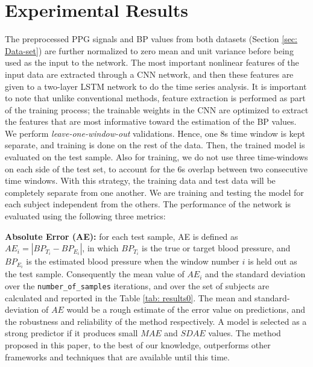 \documentclass[letterpaper, 10 pt, conference]{ieeeconf}
\begin{document}
\section{Experimental Results} 
\label{sec: results}
The preprocessed PPG signals and BP values from both datasets (Section \ref{sec: Data-set}) are further normalized to zero mean and unit variance before being used as the input to the network. The most important nonlinear features of the input data are extracted through a CNN network, and then these features are given to a two-layer LSTM network to do the time series analysis. 
It is important to note that unlike conventional methods, feature extraction is performed as part of the training process; the trainable weights in the CNN are optimized to extract the features that are most informative toward the estimation of the BP values. We perform \textit{leave-one-window-out} validations. Hence, one $8$s time window is kept separate, and training is done on the rest of the data. Then, the trained model is evaluated on the test sample. Also for training, we do not use three time-windows on each side of the test set, to account for the $6$s overlap between two consecutive time windows. With this strategy, the training data and test data will be completely separate from one another. We are training and testing the model for each subject independent from the others. The performance of the network is evaluated using the following three metrics:

\textbf{Absolute Error (AE):} for each test sample, AE is defined as
$AE_i = |BP_{T_i} - BP_{E_i} |$,
in which $BP_{T_i}$ is the true or target blood pressure, and $BP_{E_i}$ is the estimated blood pressure when the window number $i$ is held out as the test sample. Consequently the mean value of ${AE_i}$ and the standard deviation over the \verb|number_of_samples| iterations, and over the set of subjects are calculated and reported in the Table \ref{tab: results0}. The mean and standard-deviation of $AE$ would be a rough estimate of the error value on predictions, and the robustness and reliability of the method respectively. A model is selected as a strong predictor if it produces small $MAE$ and $SDAE$ values. The method proposed in this paper, to the best of our knowledge, outperforms other frameworks and techniques that are available until this time.
\end{document}

